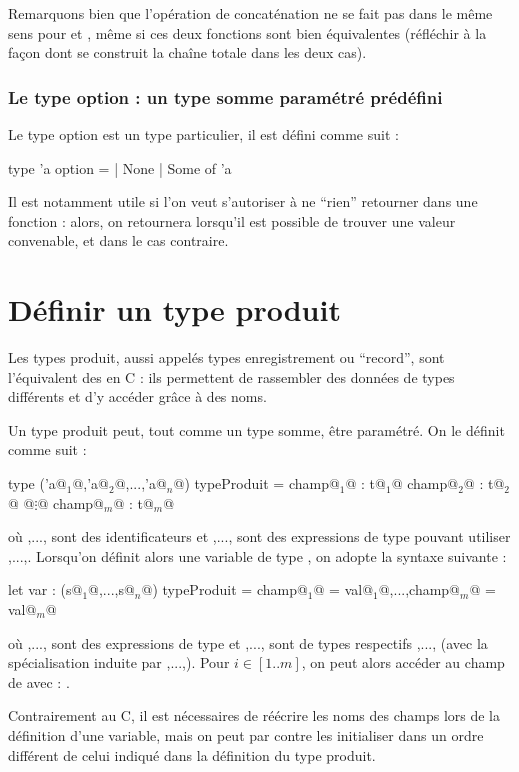 \begin{Remarque}
	Remarquons bien que l'opération de concaténation ne se fait pas dans le même sens pour  et , même si ces deux fonctions sont bien équivalentes (réfléchir à la façon dont se construit la chaîne totale dans les deux cas).
\end{Remarque}

		\subsubsection{Le type option : un type somme paramétré prédéfini}
		
			Le type option est un type particulier, il est défini comme suit :
				\begin{Caml}
							type 'a option =
								| None
								| Some of 'a
				\end{Caml}
			Il est notamment utile si l'on veut s'autoriser à ne ``rien'' retourner dans une fonction : alors, on retournera  lorsqu'il est possible de trouver une valeur  convenable, et  dans le cas contraire.
			
	\section{Définir un type produit}
	
		Les types produit, aussi appelés types enregistrement ou ``record'', sont l'équivalent des  en C : ils permettent de rassembler des données de types différents et d'y accéder grâce à des noms.
		
		\begin{Syntaxe}
			Un type produit peut, tout comme un type somme, être paramétré. On le définit comme suit :
				\begin{Caml}
					type ('a@$_1$@,'a@$_2$@,...,'a@$_n$@) typeProduit = {
						champ@$_1$@ : t@$_1$@
						champ@$_2$@ : t@$_2$@
						   @$\vdots$@
						champ@$_m$@ : t@$_m$@
					}
				\end{Caml}
			où ,..., sont des identificateurs et ,..., sont des expressions de type pouvant utiliser ,...,. \nll
			\bdot Lorsqu'on définit alors une variable de type , on adopte la syntaxe suivante : 
				\begin{Caml}
	let var : (s@$_1$@,...,s@$_n$@) typeProduit = {champ@$_1$@ = val@$_1$@,...,champ@$_m$@ = val@$_m$@}
				\end{Caml}
			où ,..., sont des expressions de type et ,..., sont de types respectifs ,..., (avec la spécialisation induite par ,...,). \nll
			\bdot Pour \(i\in[1..m]\), on peut alors accéder au champ  de  avec : .
		\end{Syntaxe}
	
		\begin{Remarque}
			Contrairement au C, il est nécessaires de réécrire les noms des champs lors de la définition d'une variable, mais on peut par contre les initialiser dans un ordre différent de celui indiqué dans la définition du type produit.
		\end{Remarque}
